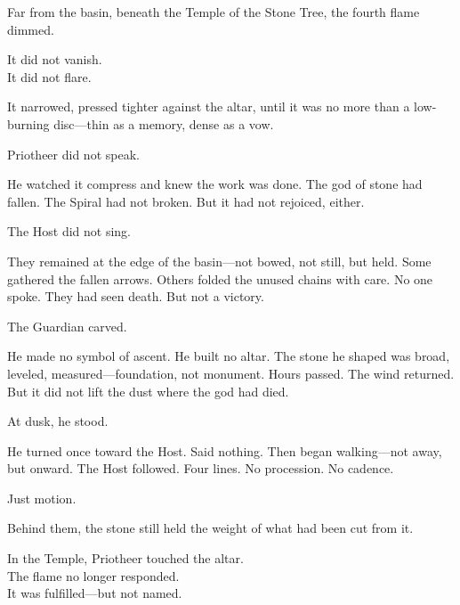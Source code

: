 \documentclass[12pt]{article}
\begin{document}
Far from the basin, beneath the Temple of the Stone Tree, the fourth flame dimmed.

\vspace{0.5em}
It did not vanish.\\
It did not flare.

\vspace{0.5em}
It narrowed, pressed tighter against the altar, until it was no more than a low-burning disc---thin as a memory, dense as a vow.

\vspace{0.5em}
Priotheer did not speak.

\vspace{0.5em}
He watched it compress and knew the work was done. The god of stone had fallen. The Spiral had not broken. But it had not rejoiced, either.

\vspace{0.5em}
The Host did not sing.

\vspace{0.5em}
They remained at the edge of the basin---not bowed, not still, but held. Some gathered the fallen arrows. Others folded the unused chains with care. No one spoke. They had seen death. But not a victory.

\vspace{0.5em}
The Guardian carved.

\vspace{0.5em}
He made no symbol of ascent. He built no altar. The stone he shaped was broad, leveled, measured---foundation, not monument. Hours passed. The wind returned. But it did not lift the dust where the god had died.

\vspace{0.5em}
At dusk, he stood.

\vspace{0.5em}
He turned once toward the Host. Said nothing. Then began walking---not away, but onward. The Host followed. Four lines. No procession. No cadence.

\vspace{0.5em}
Just motion.

\vspace{0.5em}
Behind them, the stone still held the weight of what had been cut from it.

\vspace{0.5em}
In the Temple, Priotheer touched the altar.\\
The flame no longer responded.\\
It was fulfilled---but not named.
\end{document}
